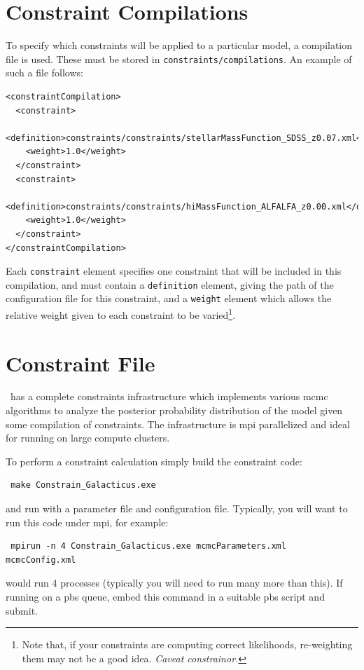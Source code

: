 \section{Constraint Compilations}

To specify which constraints will be applied to a particular model, a compilation file is used. These must be stored in {\tt constraints/compilations}. An example of such a file follows:
\begin{verbatim}
<constraintCompilation>
  <constraint>
    <definition>constraints/constraints/stellarMassFunction_SDSS_z0.07.xml</definition>
    <weight>1.0</weight>
  </constraint>
  <constraint>
    <definition>constraints/constraints/hiMassFunction_ALFALFA_z0.00.xml</definition>
    <weight>1.0</weight>
  </constraint>
</constraintCompilation>
\end{verbatim}
Each {\tt constraint} element specifies one constraint that will be included in this compilation, and must contain a {\tt definition} element, giving the path of the configuration file for this constraint, and a {\tt weight} element which allows the relative weight given to each constraint to be varied\footnote{Note that, if your constraints are computing correct likelihoods, re-weighting them may not be a good idea. \emph{Caveat constrainor.}}.

\section{Constraint File}

\glc\ has a complete constraints infrastructure which implements various \gls{mcmc} algorithms to analyze the posterior probability distribution of the model given some compilation of constraints. The infrastructure is \gls{mpi} parallelized and ideal for running on large compute clusters.

To perform a constraint calculation simply build the constraint code:
\begin{verbatim}
 make Constrain_Galacticus.exe
\end{verbatim}
and run with a parameter file and configuration file. Typically, you will want to run this code under \gls{mpi}, for example:
\begin{verbatim}
 mpirun -n 4 Constrain_Galacticus.exe mcmcParameters.xml mcmcConfig.xml
\end{verbatim}
would run 4 processes (typically you will need to run many more than this). If running on a \gls{pbs} queue, embed this command in a suitable \gls{pbs} script and submit. 

